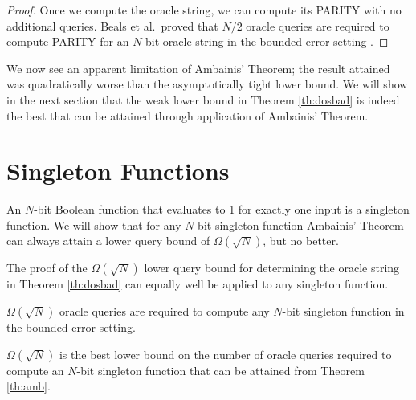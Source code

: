 \begin{proof}
Once we compute the oracle string, we can compute its PARITY with no
additional queries.  Beals et al.\ proved that $N/2$ oracle queries
are required to compute PARITY for an $N$-bit oracle string in the
bounded error setting \cite{beals98quantum}.
\end{proof}

We now see an apparent limitation of Ambainis' Theorem; the result
attained was quadratically worse than the asymptotically tight lower
bound.  We will show in the next section that the weak lower bound in
Theorem \ref{th:dosbad} is indeed the best that can be attained
through application of Ambainis' Theorem.

\section{Singleton Functions}
\label{sec:torf1}

An $N$-bit Boolean function that evaluates to 1 for exactly one input
is a singleton function.  We will show that for any $N$-bit singleton
function Ambainis' Theorem can always attain a lower query bound of
$\Omega(\sqrt{N})$, but no better.

The proof of the $\Omega(\sqrt{N})$ lower query bound for determining
the oracle string in Theorem \ref{th:dosbad} can equally well be
applied to any singleton function.

\begin{corollary}
\label{th:1sqn}
$\Omega(\sqrt{N})$ oracle queries are required to compute any $N$-bit
singleton function in the bounded error setting.
\end{corollary}

\begin{theorem}
\label{th:best}
$\Omega(\sqrt{N})$ is the best lower bound on the number of oracle
queries required to compute an $N$-bit singleton function that can be
attained from Theorem \ref{th:amb}.
\end{theorem}

